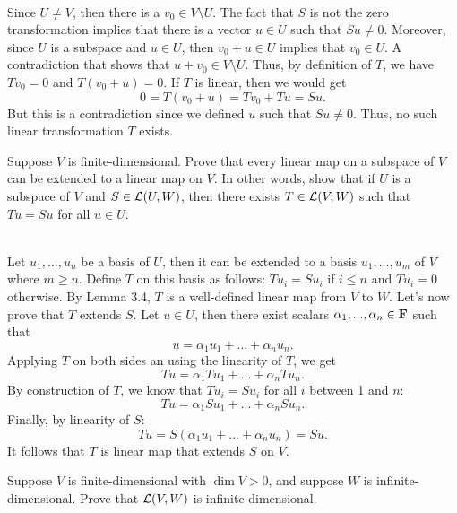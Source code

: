 \begin{solution}
    \\ Since $U \neq V$, then there is a $v_0 \in V \setminus U$. The fact that $S$ is not the zero transformation implies that there is a vector $u \in U$ such that $Su \neq 0$. Moreover, since $U$ is a subspace and $u \in U$, then $v_0 + u \in U$ implies that $v_0 \in U$. A contradiction that shows that $u + v_0 \in V \setminus U$. Thus, by definition of $T$, we have $Tv_0 = 0$ and $T(v_0 + u) = 0$. If $T$ is linear, then we would get
    $$0 = T(v_0 + u) = Tv_0 + Tu = Su.$$
    But this is a contradiction since we defined $u$ such that $Su \neq 0$. Thus, no such linear transformation $T$ exists. \\
\end{solution}

\begin{exercise}
    Suppose $V$ is finite-dimensional. Prove that every linear map on a subspace of $V$ can be extended to a linear map on $V$. In other words, show that if $U$ is a subspace of $V$ and $S \in \mathcal{L}(U,W)$, then there exists $T \in \mathcal{L}(V,W)$ such that $Tu = Su$ for all $u \in U$. \\
\end{exercise}

\begin{solution}
    \\ Let $u_1, ..., u_n$ be a basis of $U$, then it can be extended to a basis $u_1, ..., u_m$ of $V$ where $m \geq n$. Define $T$ on this basis as follows: $Tu_i = Su_i$ if $i \leq n$ and $Tu_i = 0$ otherwise. By Lemma 3.4, $T$ is a well-defined linear map from $V$ to $W$. Let's now prove that $T$ extends $S$. Let $u \in U$, then there exist scalars $\alpha_1, ..., \alpha_n \in \mathbf{F}$ such that 
    $$u = \alpha_1 u_1 + ... + \alpha_n u_n.$$
    Applying $T$ on both sides an using the linearity of $T$, we get
    $$Tu = \alpha_1 Tu_1 + ... + \alpha_n Tu_n.$$
    By construction of $T$, we know that $Tu_i = Su_i$ for all $i$ between 1 and $n$:
    $$Tu = \alpha_1 Su_1 + ... + \alpha_n Su_n.$$
    Finally, by linearity of $S$:
    $$Tu = S(\alpha_1 u_1 + ... + \alpha_n u_n) = Su.$$
    It follows that $T$ is linear map that extends $S$ on $V$. \\
\end{solution}

\begin{exercise}
    Suppose $V$ is finite-dimensional with $\dim V > 0$, and suppose $W$ is infinite-dimensional. Prove that $\mathcal{L}(V,W)$ is infinite-dimensional. \\
\end{exercise}

